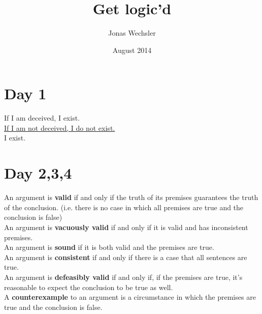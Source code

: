 \documentclass{article}
\title{Get logic'd}
\author{Jonas Wechsler}
\date{August 2014}
\begin{document}
\maketitle

\section{Day 1}
If I am deceived, I exist.
\\ \underline{If I am not deceived, I do not exist.}
\\ I exist.
\section{Day 2,3,4}
An argument is \textbf{valid} if and only if the truth of its premises guarantees the truth of the conclusion. (i.e. there is no case in which all premises are true and the conclusion is false)
\\An argument is \textbf{vacuously valid} if and only if it is valid and has inconsistent premises.
\\An argument is \textbf{sound} if it is both valid and the premises are true.
\\An argument is \textbf{consistent} if and only if there is a case that all sentences are true.
\\An argument is \textbf{defeasibly valid} if and only if, if the premises are true, it's reasonable to expect the conclusion to be true as well.
\\A \textbf{counterexample} to an argument is a circumstance in which the premises are true and the conclusion is false.
\end{document}
